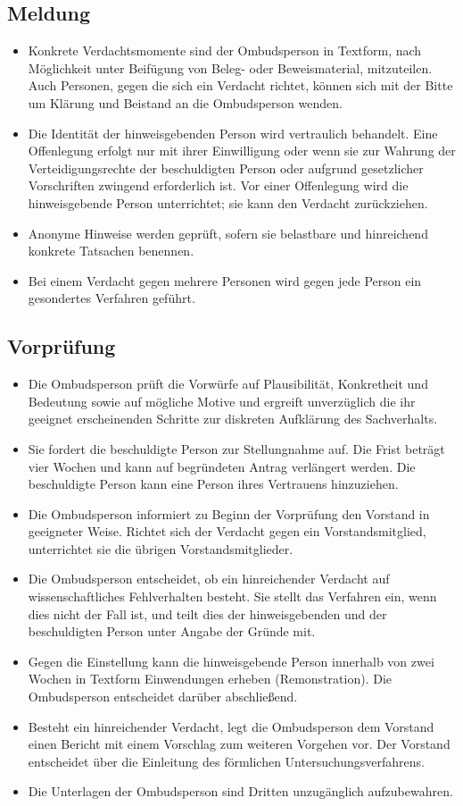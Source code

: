 \documentclass[a4paper, fontsize=11pt]{scrartcl}
\begin{document}
\subsection{Meldung}
\begin{itemize}
  \item Konkrete Verdachtsmomente sind der Ombudsperson in Textform, nach Möglichkeit unter Beifügung von Beleg- oder Beweismaterial, mitzuteilen. Auch Personen, gegen die sich ein Verdacht richtet, können sich mit der Bitte um Klärung und Beistand an die Ombudsperson wenden.
  \item Die Identität der hinweisgebenden Person wird vertraulich behandelt. Eine Offenlegung erfolgt nur mit ihrer Einwilligung oder wenn sie zur Wahrung der Verteidigungsrechte der beschuldigten Person oder aufgrund gesetzlicher Vorschriften zwingend erforderlich ist. Vor einer Offenlegung wird die hinweisgebende Person unterrichtet; sie kann den Verdacht zurückziehen.
  \item Anonyme Hinweise werden geprüft, sofern sie belastbare und hinreichend konkrete Tatsachen benennen.
  \item Bei einem Verdacht gegen mehrere Personen wird gegen jede Person ein gesondertes Verfahren geführt.
\end{itemize}

\subsection{Vorprüfung}
\begin{itemize}
  \item Die Ombudsperson prüft die Vorwürfe auf Plausibilität, Konkretheit und Bedeutung sowie auf mögliche Motive und ergreift unverzüglich die ihr geeignet erscheinenden Schritte zur diskreten Aufklärung des Sachverhalts.
  \item Sie fordert die beschuldigte Person zur Stellungnahme auf. Die Frist beträgt vier Wochen und kann auf begründeten Antrag verlängert werden. Die beschuldigte Person kann eine Person ihres Vertrauens hinzuziehen.
  \item Die Ombudsperson informiert zu Beginn der Vorprüfung den Vorstand in geeigneter Weise. Richtet sich der Verdacht gegen ein Vorstandsmitglied, unterrichtet sie die übrigen Vorstandsmitglieder.
  \item Die Ombudsperson entscheidet, ob ein hinreichender Verdacht auf wissenschaftliches Fehlverhalten besteht. Sie stellt das Verfahren ein, wenn dies nicht der Fall ist, und teilt dies der hinweisgebenden und der beschuldigten Person unter Angabe der Gründe mit.
  \item Gegen die Einstellung kann die hinweisgebende Person innerhalb von zwei Wochen in Textform Einwendungen erheben (Remonstration). Die Ombudsperson entscheidet darüber abschließend.
  \item Besteht ein hinreichender Verdacht, legt die Ombudsperson dem Vorstand einen Bericht mit einem Vorschlag zum weiteren Vorgehen vor. Der Vorstand entscheidet über die Einleitung des förmlichen Untersuchungsverfahrens.
  \item Die Unterlagen der Ombudsperson sind Dritten unzugänglich aufzubewahren.
\end{itemize}
\end{document}

